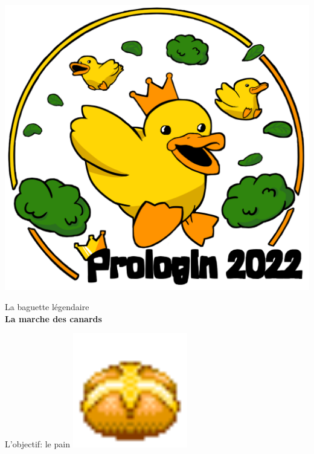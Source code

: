 \documentclass[table]{beamer}
\title[La baguette légendaire]{}
\author[Prologin]{}
\date{}
\begin{document}
\begin{frame}
    \centering \includegraphics[width=0.7\linewidth]{img/logo-finale-2022.png}
\end{frame}

\begin{frame}
    \Large
    \begin{center}
        La baguette légendaire\\
        \textbf{La marche des canards}
    \end{center}
\end{frame}


\begin{frame}{L'objectif: le pain}
\centering
\includegraphics[width=5cm]{img/sprite/bread.png}
\end{frame}
\end{document}
